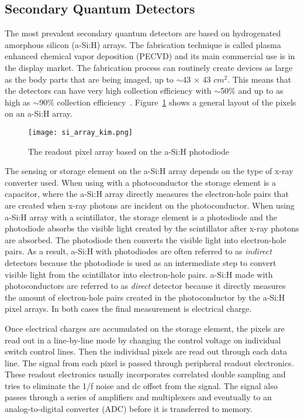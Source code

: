 \subsection{Secondary Quantum Detectors}
The most prevalent secondary quantum detectors are based on hydrogenated amorphous silicon (a-Si:H) arrays.  The fabrication technique is called plasma enhanced chemical vapor deposition (PECVD) and its main commercial use is in the display market.  The fabrication process can routinely create devices as large as the body parts that are being imaged, up to $\sim$43 $\times$ 43 $cm^2$.  This means that the detectors can have very high collection efficiency with $\sim$50$\%$ and up to as high as $\sim$90$\%$ collection efficiency~\citep{Yorkston2007}.
Figure~\ref{fig:a-Si:H array} shows a general layout of the pixels on an a-Si:H array.  

\begin{figure}[ht]
\texttt{[image: si\_array\_kim.png]}
\caption{The readout pixel array based on the a-Si:H photodiode~\citep{Kim2008}}
\label{fig:a-Si:H array}
\end{figure}

The sensing or storage element on the a-Si:H array depends on the type of x-ray converter used.  When using with a photoconductor the storage element is a capacitor, where the a-Si:H array directly measures the electron-hole pairs that are created when x-ray photons are incident on the photoconductor.  When using a-Si:H array with a scintillator, the storage element is a photodiode and the photodiode absorbs the visible light created by the scintillator after x-ray photons are absorbed. The photodiode then converts the visible light into electron-hole pairs.  As a result, a-Si:H with photodiodes are often referred to as \textit{indirect} detectors because the photodiode is used as an intermediate step to convert visible light from the scintillator into electron-hole pairs.  a-Si:H made with photoconductors are referred to as \textit{direct} detector because it directly measures the amount of electron-hole pairs created in the photoconductor by the a-Si:H pixel arrays.  In both cases the final measurement is electrical charge.  

Once electrical charges are accumulated on the storage element, the pixels are read out in a line-by-line mode by changing the control voltage on individual switch control lines.  Then the individual pixels are read out through each data line.  The signal from each pixel is passed through peripheral readout electronics.  These readout electronics usually incorporates correlated double sampling and tries to eliminate the 1/f noise and dc offset from the signal.  The signal also passes through a series of amplifiers and multiplexers and eventually to an analog-to-digital converter (ADC) before it is transferred to memory.  

